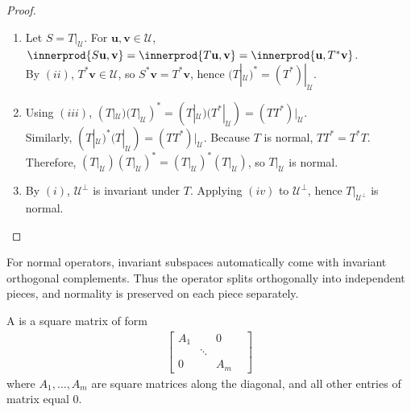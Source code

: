 \begin{proposition}
\begin{proof}
\begin{enumerate}[label=\roman*.]
Therefore, $T^* \mathbf{u} \in (\mathcal{U}^{\perp})^{\perp} = \mathcal{U}$, so $\mathcal{U}$ is invariant under $T^*$.
\item[$(iii)$] Let $S = T|_{\mathcal{U}}$. For $\mathbf{u}, \mathbf{v} \in \mathcal{U}$, $\innerprod{S \mathbf{u}, \mathbf{v}} = \innerprod{T \mathbf{u}, \mathbf{v}} = \innerprod{\mathbf{u}, T^* \mathbf{v}}$.\\
By $(ii)$, $T^* \mathbf{v} \in \mathcal{U}$, so $S^* \mathbf{v} = T^* \mathbf{v}$, hence $(T|_{\mathcal{U}})^* = (T^*)|_{\mathcal{U}}$.
\item[$(iv)$] Using $(iii)$, $(T|_{\mathcal{U}})(T|_{\mathcal{U}})^* = (T|_{\mathcal{U}}) (T^*|_{\mathcal{U}}) = (TT^*)|_{\mathcal{U}}$.\\
Similarly, $(T|_{\mathcal{U}})^* (T|_{\mathcal{U}}) = (TT^*)|_{\mathcal{U}}$. Because $T$ is normal, $TT^* = T^* T$.\\
Therefore, $(T|_{\mathcal{U}})(T|_{\mathcal{U}})^* = (T|_{\mathcal{U}})^* (T|_{\mathcal{U}})$, so $T|_{\mathcal{U}}$ is normal.
\item[$(v)$] By $(i)$, $\mathcal{U}^{\perp}$ is invariant under $T$. Applying $(iv)$ to $\mathcal{U}^{\perp}$, hence $T|_{\mathcal{U}^{\perp}}$ is normal.
\end{enumerate} 
\end{proof}
\end{proposition}

For normal operators, invariant subspaces automatically come with invariant orthogonal complements. Thus the operator splits orthogonally into independent pieces, and normality is preserved on each piece separately.

\begin{definition} A  is a square matrix of form
\begin{align}
\begin{bmatrix}
A_1 & & 0 \\
& \ddots & & \\
0 & & A_m
\end{bmatrix} \nonumber
\end{align}
where $A_1, \ldots, A_m$ are square matrices along the diagonal, and all other entries of matrix equal $0$.
\end{definition}

